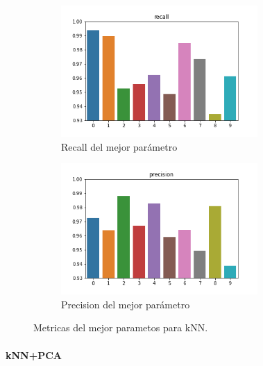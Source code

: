\begin{figure}[H]
\begin{subfigure}{0.5\textwidth}
\includegraphics[width=0.9\linewidth, height=5cm]{images/recall_knn.png} 
\caption{Recall del mejor parámetro}
\end{subfigure}
\begin{subfigure}{0.5\textwidth}
\includegraphics[width=0.9\linewidth, height=5cm]{images/precision_knn.png} 
\caption{Precision del mejor parámetro}
\end{subfigure}
\caption{Metricas del mejor parametos para kNN.}
\label{knn_metricas}%
\end{figure}





\paragraph{kNN+PCA}


